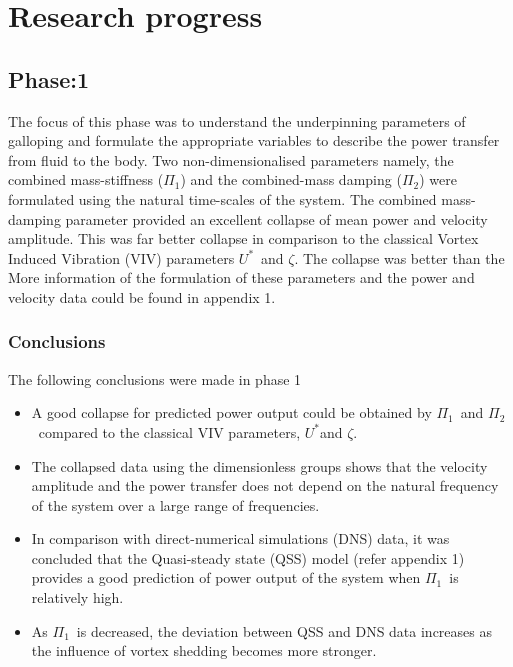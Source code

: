 \documentclass[authoryear,12pt]{article}
\newcommand{\ustar}{\ensuremath{U^{*}}}
\newcommand{\massstiff}{\ensuremath{\Pi_1}}
\newcommand{\massdamp}{\ensuremath{\Pi_2}}
\begin{document}
\clearpage

\section{Research progress}

\subsection{Phase:1}
 
The focus of this phase was to understand the underpinning parameters of galloping and formulate the appropriate variables to describe the power transfer from fluid to the body. Two non-dimensionalised parameters namely, the combined mass-stiffness (\massstiff) and the combined-mass damping (\massdamp) were formulated using the natural time-scales of the system. The combined mass-damping parameter provided an excellent collapse of mean power and velocity amplitude. This was far better collapse in comparison to the classical Vortex Induced Vibration (VIV) parameters \ustar \ and $\zeta$. The collapse was better than the  More information of the formulation of these parameters and the power and velocity data could be found in appendix 1.    

\subsubsection*{Conclusions}

The following conclusions were made in phase 1 

\begin{itemize}
\item  A good collapse for predicted power output could be obtained by \massstiff \ and \massdamp \ compared to the classical VIV parameters, \ustar and $\zeta$. 

\item The collapsed data using the dimensionless groups shows that the velocity amplitude and the power transfer does not depend on the natural frequency of the system over a large range of frequencies. 

\item In comparison with direct-numerical simulations (DNS) data, it was concluded that the Quasi-steady state (QSS) model (refer appendix 1) provides a good prediction of power output of the system when \massstiff \ is relatively high.   

\item As \massstiff \ is decreased, the deviation between QSS and DNS data increases as the influence of vortex shedding becomes more stronger.   
\end{itemize}
\end{document}

